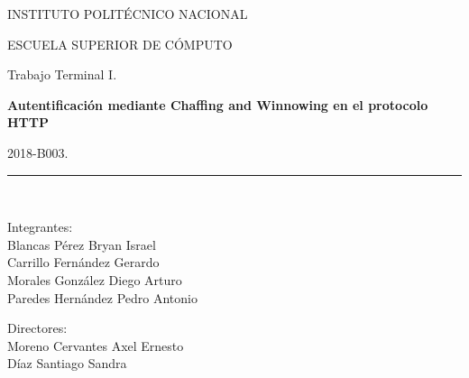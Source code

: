 \documentclass[12pt, a4paper, titlepage]{report}
\begin{document}
\begin{titlepage}
		\begin{center}
			
			\begin{LARGE}
				\textcolor{guindapoli}{INSTITUTO POLITÉCNICO NACIONAL}\\
			\end{LARGE}	
			
			\vspace*{0.2in}
			
			\begin{Large}
				\textcolor{azulescom}{ESCUELA SUPERIOR DE CÓMPUTO}\\
			\end{Large}		
			
			\vspace*{0.4in}
			
			\begin{large}
				Trabajo Terminal I.\\
			\end{large}
			
			\vspace*{0.2in}
			
			\begin{Large}
				\textbf{Autentificación mediante Chaffing and Winnowing en el protocolo HTTP}\\
			\end{Large}
			
			\vspace*{0.2in}
			
			\begin{large}
				2018-B003.\\
			\end{large}
			
			\vspace*{0.2in}
			
			\rule{80mm}{.1mm}\\
			\vspace*{0.1in}
			
			\begin{large}
				\begin{center}
					Integrantes:\\
					Blancas Pérez Bryan Israel\\
					Carrillo Fernández Gerardo\\
					Morales González Diego Arturo\\
					Paredes Hernández Pedro Antonio\\
				\end{center}
			\end{large}
			
			\begin{large}
				Directores:\\
				Moreno Cervantes Axel Ernesto\\
				Díaz Santiago Sandra\\
			\end{large}
			
		\end{center}
	
	\end{titlepage}
\end{document}
